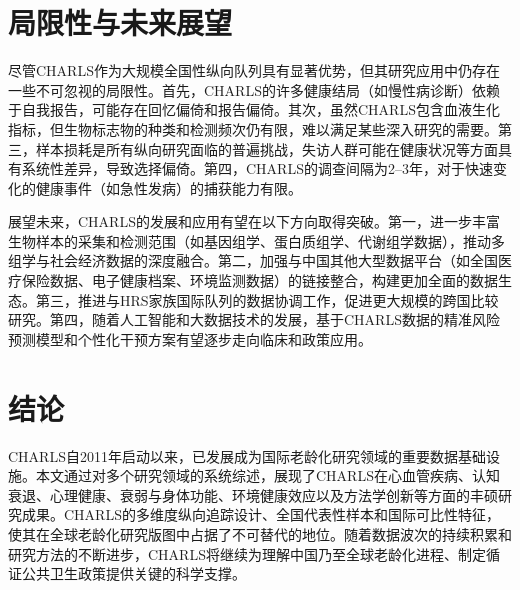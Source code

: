 \documentclass[12pt,a4paper]{article}
\begin{document}
\section{局限性与未来展望}

尽管CHARLS作为大规模全国性纵向队列具有显著优势，但其研究应用中仍存在一些不可忽视的局限性。首先，CHARLS的许多健康结局（如慢性病诊断）依赖于自我报告，可能存在回忆偏倚和报告偏倚。其次，虽然CHARLS包含血液生化指标，但生物标志物的种类和检测频次仍有限，难以满足某些深入研究的需要。第三，样本损耗是所有纵向研究面临的普遍挑战，失访人群可能在健康状况等方面具有系统性差异，导致选择偏倚。第四，CHARLS的调查间隔为2--3年，对于快速变化的健康事件（如急性发病）的捕获能力有限。

展望未来，CHARLS的发展和应用有望在以下方向取得突破。第一，进一步丰富生物样本的采集和检测范围（如基因组学、蛋白质组学、代谢组学数据），推动多组学与社会经济数据的深度融合。第二，加强与中国其他大型数据平台（如全国医疗保险数据、电子健康档案、环境监测数据）的链接整合，构建更加全面的数据生态。第三，推进与HRS家族国际队列的数据协调工作，促进更大规模的跨国比较研究。第四，随着人工智能和大数据技术的发展，基于CHARLS数据的精准风险预测模型和个性化干预方案有望逐步走向临床和政策应用。

\section{结论}

CHARLS自2011年启动以来，已发展成为国际老龄化研究领域的重要数据基础设施。本文通过对多个研究领域的系统综述，展现了CHARLS在心血管疾病、认知衰退、心理健康、衰弱与身体功能、环境健康效应以及方法学创新等方面的丰硕研究成果。CHARLS的多维度纵向追踪设计、全国代表性样本和国际可比性特征，使其在全球老龄化研究版图中占据了不可替代的地位。随着数据波次的持续积累和研究方法的不断进步，CHARLS将继续为理解中国乃至全球老龄化进程、制定循证公共卫生政策提供关键的科学支撑。


\end{document}
